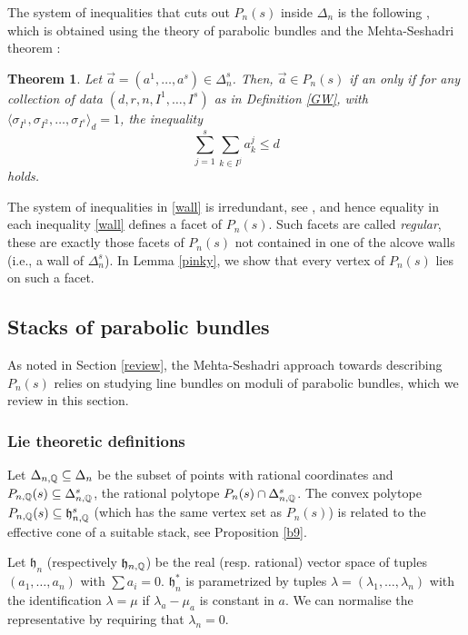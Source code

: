 \documentclass[11pt]{amsart}
\newcommand\frh{\mathfrak{h}}
\newtheorem{theorem}{Theorem}[section]
\numberwithin{theorem}{subsection}
\begin{document}
The system of inequalities that cuts out $P_n(s)$ inside $\Delta_n$ is the following \cite{AW,BLocal}, which is obtained using the theory of parabolic bundles and the Mehta-Seshadri theorem \cite{MS}:
\begin{theorem}\label{ABW}
Let $\vec{a}=(a^1,\dots,a^s)\in \Delta_n^s$.
Then, $\vec{a}\in P_{n}(s)$ if an only if for any collection of data
$(d,r,n,I^1,\dots,I^s)$ as in Definition \ref{GW}, with $\langle\sigma_{I^1}, \sigma_{I^2},\dots,\sigma_{I^s}\rangle_d= 1$, the inequality
\begin{equation}\label{wall}
\sum_{j=1}^s\sum_{k\in I^j} a_k^{j}\leq d
\end{equation}
holds.
\end{theorem}
The system of inequalities in \eqref{wall} is irredundant, see \cite[Remark 8.6]{BKq}, and hence equality in each inequality \eqref{wall} defines a facet of $P_n(s)$. Such facets are called {\em regular}, these are exactly those facets of $P_n(s)$ not contained in one of the alcove walls (i.e., a wall of $\Delta_n^s$).  In Lemma \ref{pinky}, we show that every vertex of $P_n(s)$ lies on  such a facet.

\subsection{Stacks of parabolic bundles}
As noted in Section \ref{review}, the Mehta-Seshadri approach towards describing $P_n(s)$ relies
on studying line bundles on moduli of parabolic bundles, which we review in this section.
\subsubsection{Lie theoretic definitions}\label{loudvoice}
Let $\Delta_{n,\Bbb{Q}}\subseteq \Delta_n$ be the subset of points with rational coordinates and $P_{n,\Bbb{Q}}(s)\subseteq\Delta^s_{n,\Bbb{Q}}$, the rational polytope
 $P_{n}(s)\cap \Delta^s_{n,\Bbb{Q}}$. The convex polytope $P_{n,\Bbb{Q}}(s)\subseteq \frh_{n,\Bbb{Q}}^s$ (which has the same vertex set as $P_n(s)$) is related to the effective cone of a suitable stack, see Proposition \ref{b9}.

Let $\frh_n$ (respectively $\frh_{n,\Bbb{Q}}$)  be the real (resp. rational) vector space of tuples $(a_1,\dots,a_n)$ with $\sum a_i=0$. $\frh_n^*$ is parametrized by tuples $\lambda=(\lambda_1,\dots,\lambda_n)$ with the identification $\lambda=\mu$ if $\lambda_a-\mu_a$ is constant in $a$.  We can normalise the representative by requiring that $\lambda_n=0$.
\end{document}
